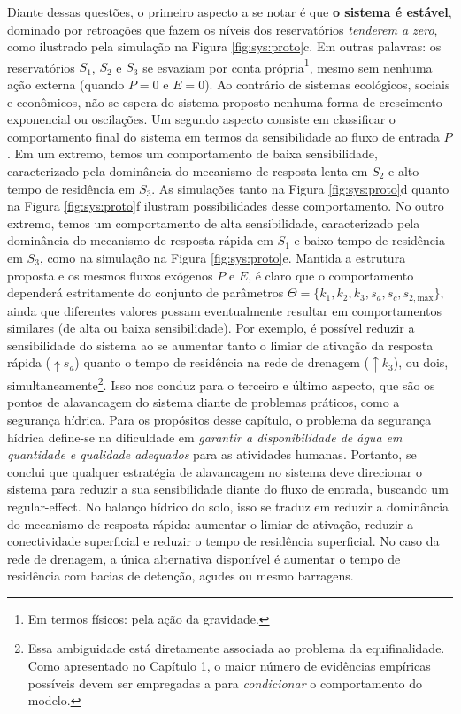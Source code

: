 \documentclass[./main.tex]{subfiles}
\begin{document}
\par Diante dessas questões, o primeiro aspecto a se notar é que \textbf{o sistema é estável}, dominado por retroações que fazem os níveis dos reservatórios \textit{tenderem a zero}, como ilustrado pela simulação na Figura \ref{fig:sys:proto}c. Em outras palavras: os reservatórios $S_1$, $S_2$ e $S_3$ se esvaziam por conta própria\footnote{Em termos físicos: pela ação da gravidade.}, mesmo sem nenhuma ação externa (quando $P=0$ e $E=0$). Ao contrário de sistemas ecológicos, sociais e econômicos, não se espera do sistema proposto nenhuma forma de crescimento exponencial ou oscilações. Um segundo aspecto consiste em classificar o comportamento final do sistema em termos da sensibilidade ao fluxo de entrada $P$. Em um extremo, temos um comportamento de baixa sensibilidade, caracterizado pela dominância do mecanismo de resposta lenta em $S_2$ e alto tempo de residência em $S_3$. As simulações tanto na Figura \ref{fig:sys:proto}d quanto na Figura \ref{fig:sys:proto}f ilustram possibilidades desse comportamento. No outro extremo, temos um comportamento de alta sensibilidade, caracterizado pela dominância do mecanismo de resposta rápida em $S_1$ e baixo tempo de residência em $S_3$, como na simulação na Figura \ref{fig:sys:proto}e. Mantida a estrutura proposta e os mesmos fluxos exógenos $P$ e $E$, é claro que o comportamento dependerá estritamente do conjunto de parâmetros $\Theta = \{k_1, k_2, k_3, s_a, s_c, s_{2, \text{max}}\}$, ainda que diferentes valores possam eventualmente resultar em comportamentos similares (de alta ou baixa sensibilidade). Por exemplo, é possível reduzir a sensibilidade do sistema ao se aumentar tanto o limiar de ativação da resposta rápida ($ \uparrow s_a$) quanto o tempo de residência na rede de drenagem ($ \uparrow k_3$), ou dois, simultaneamente\footnote{Essa ambiguidade está diretamente associada ao problema da equifinalidade. Como apresentado no Capítulo 1, o maior número de evidências empíricas possíveis devem ser empregadas a para \textit{condicionar} o comportamento do modelo.}. Isso nos conduz para o terceiro e último aspecto, que são os pontos de alavancagem do sistema diante de problemas práticos, como a segurança hídrica. Para os propósitos desse capítulo, o problema da segurança hídrica define-se na dificuldade em \textit{garantir a disponibilidade de água em quantidade e qualidade adequados} para as atividades humanas. Portanto, se conclui que qualquer estratégia de alavancagem no sistema deve direcionar o sistema para reduzir a sua sensibilidade diante do fluxo de entrada, buscando um \gls{regular-effect}. No balanço hídrico do solo, isso se traduz em reduzir a dominância do mecanismo de resposta rápida: aumentar o limiar de ativação, reduzir a conectividade superficial e reduzir o tempo de residência superficial. No caso da rede de drenagem, a única alternativa disponível é aumentar o tempo de residência com bacias de detenção, açudes ou mesmo barragens. 
\end{document}
